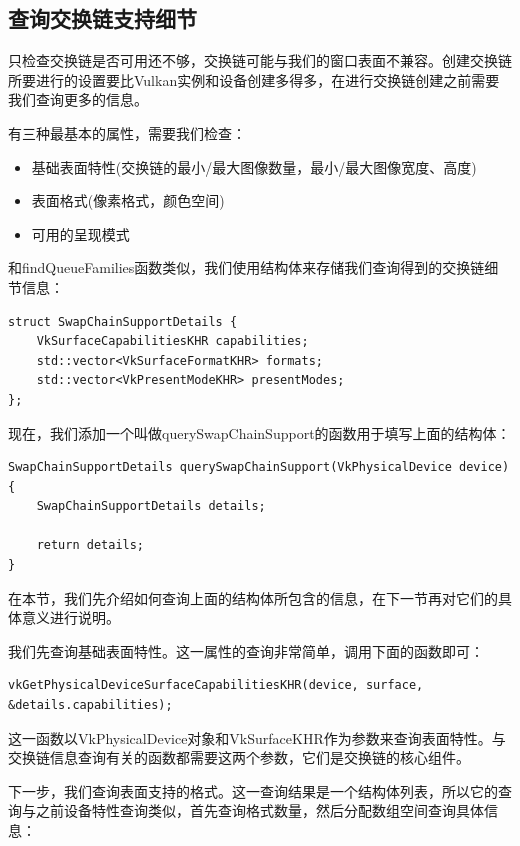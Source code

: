 \documentclass{ctexart}
\begin{document}
\subsection{查询交换链支持细节}

只检查交换链是否可用还不够，交换链可能与我们的窗口表面不兼容。创建交换链所要进行的设置要比Vulkan实例和设备创建多得多，在进行交换链创建之前需要我们查询更多的信息。

有三种最基本的属性，需要我们检查：

\begin{itemize}
	\item 基础表面特性(交换链的最小/最大图像数量，最小/最大图像宽度、高度)
	\item 表面格式(像素格式，颜色空间)
	\item 可用的呈现模式
\end{itemize}

和findQueueFamilies函数类似，我们使用结构体来存储我们查询得到的交换链细节信息：

\begin{lstlisting}[language={[ANSI]C}]
struct SwapChainSupportDetails {
	VkSurfaceCapabilitiesKHR capabilities;
	std::vector<VkSurfaceFormatKHR> formats;
	std::vector<VkPresentModeKHR> presentModes;
};
\end{lstlisting}

现在，我们添加一个叫做querySwapChainSupport的函数用于填写上面的结构体：

\begin{lstlisting}[language={[ANSI]C}]
SwapChainSupportDetails querySwapChainSupport(VkPhysicalDevice device) {
	SwapChainSupportDetails details;

	return details;
}
\end{lstlisting}

在本节，我们先介绍如何查询上面的结构体所包含的信息，在下一节再对它们的具体意义进行说明。

我们先查询基础表面特性。这一属性的查询非常简单，调用下面的函数即可：

\begin{lstlisting}[language={[ANSI]C}]
vkGetPhysicalDeviceSurfaceCapabilitiesKHR(device, surface, &details.capabilities);
\end{lstlisting}

这一函数以VkPhysicalDevice对象和VkSurfaceKHR作为参数来查询表面特性。与交换链信息查询有关的函数都需要这两个参数，它们是交换链的核心组件。

下一步，我们查询表面支持的格式。这一查询结果是一个结构体列表，所以它的查询与之前设备特性查询类似，首先查询格式数量，然后分配数组空间查询具体信息：
\end{document}
